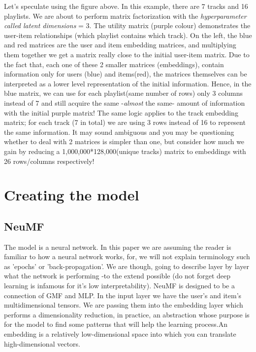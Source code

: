 \documentclass[]{article}
\begin{document}
\begin{center}
	Let's speculate using the figure above. In this example, there are 7 tracks and 16 playlists. We are about to perform matrix factorization with the \textit{hyperparameter called latent dimensions} = 3. The utility matrix (purple colour) demonstrates the user-item relationships (which playlist contains which track). On the left, the blue and red matrices are the user and item embedding matrices, and multiplying them together we get a matrix really close to the initial user-item matrix. Due to the fact that, each one of these 2 smaller matrices (embeddings), contain information only for users (blue) and items(red), the matrices themselves can be interpreted as a lower level representation of the initial information. Hence, in the blue matrix, we can use for each playlist(same number of rows) only 3 columns instead of 7 and still acquire the same -\textit{almost} the same- amount of information with the initial purple matrix! The same logic applies to the track embedding matrix; for each track (7 in total) we are using 3 rows instead of 16 to represent the same information. It may sound ambiguous and you may be questioning whether to deal with 2 matrices is simpler than one, but consider how much we gain by reducing a 1,000,000*128,000(unique tracks) matrix to embeddings with 26 rows/columns respectively! 
\end{center}


\section{Creating the model}
\subsection{NeuMF}
The model is a neural network. In this paper we are assuming the reader is familiar to how a neural network works, for, we will not explain terminology such as 'epochs' or 'back-propagation'. We are though, going to describe layer by layer what the network is performing -to the extend possible (do not forget deep learning is infamous for it's low interpretability).
NeuMF is designed to be a connection of GMF and MLP. In the input layer we have the user's and item's multidimensional tensors. We are passing them into the embedding layer which performs a dimensionality reduction, in practice, an abstraction whose purpose is for the model to find some patterns that will help the learning process.An embedding is a relatively low-dimensional space into which you can translate high-dimensional vectors.
\end{document}
